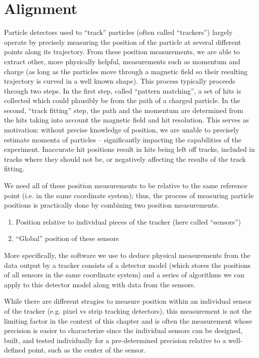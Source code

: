 \chapter{Alignment}
\label{chapter:hps:alignment}

Particle detectors used to ``track'' particles (often called ``trackers'') largely operate by
precisely measuring the position of the particle at several different points along its trajectory.
From these position measurements, we are able to extract other, more physically helpful,
measurements such as momentum and charge (as long as the particles move through a magnetic field so
their resulting trajectory is curved in a well known shape).
This process typically proceeds through two steps.
In the first step, called ``pattern matching'', a set of hits is collected which could plausibly
be from the path of a charged particle.
In the second, ``track fitting'' step, the path and the momentum are determined from the
hits taking into account the magnetic field and hit resolution.
This serves as motivation: without precise knowledge of position,
we are unable to precisely estimate momenta of particles -- significantly
impacting the capabilities of the experiment.
Inaccurate hit positions result in hits being left off tracks, included
in tracks where they should not be, or negatively affecting the results
of the track fitting.

We need all of these position measurements to be relative to the same reference point (i.e. in the
same coordinate system); thus, the process of measuring particle positions is practically done by
combining two position measurements.
\begin{enumerate}
  \item Position relative to individual pieces of the tracker (here called ``sensors'')
  \item ``Global'' position of these sensors
\end{enumerate}
More specifically, the software we use to deduce physical measurements from the data
output by a tracker consists of a detector model (which stores the positions of all
sensors in the same coordinate system) and a series of algorithms we can apply to
this detector model along with data from the sensors.

While there are different stragies to measure position within an individual sensor of the tracker
(e.g. pixel vs strip tracking detectors), this measurement is not the limiting factor in the
context of this chapter and is often the measurement whose precision is easier to characterize
since the individual sensors can be designed, built, and tested individually for a pre-determined
precision relative to a well-defined point, such as the center of the sensor.


